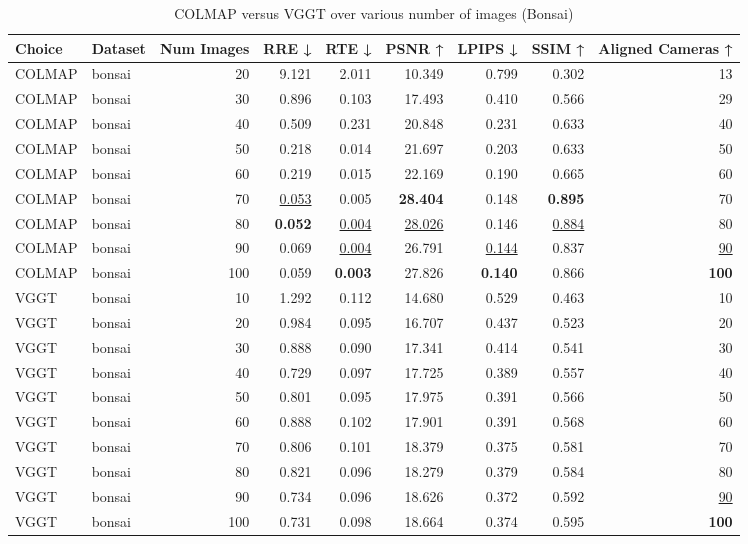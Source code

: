 \begin{table}[H]
\caption{\ifdefined\customcaption \customcaption \else COLMAP versus VGGT over various number of images (Bonsai) \fi}
\label{tab:01_num_images_brief_bonsai}
\centering
\scriptsize
\begin{tabular}{llrrrrrrr}
\toprule
Choice & Dataset & Num Images & RRE ↓ & RTE ↓ & PSNR ↑ & LPIPS ↓ & SSIM ↑ & Aligned Cameras ↑ \\
\midrule
COLMAP & bonsai & 20 & 9.121 & 2.011 & 10.349 & 0.799 & 0.302 & 13 \\
COLMAP & bonsai & 30 & 0.896 & 0.103 & 17.493 & 0.410 & 0.566 & 29 \\
COLMAP & bonsai & 40 & 0.509 & 0.231 & 20.848 & 0.231 & 0.633 & 40 \\
COLMAP & bonsai & 50 & 0.218 & 0.014 & 21.697 & 0.203 & 0.633 & 50 \\
COLMAP & bonsai & 60 & 0.219 & 0.015 & 22.169 & 0.190 & 0.665 & 60 \\
COLMAP & bonsai & 70 & \underline{0.053} & 0.005 & \textbf{28.404} & 0.148 & \textbf{0.895} & 70 \\
COLMAP & bonsai & 80 & \textbf{0.052} & \underline{0.004} & \underline{28.026} & 0.146 & \underline{0.884} & 80 \\
COLMAP & bonsai & 90 & 0.069 & \underline{0.004} & 26.791 & \underline{0.144} & 0.837 & \underline{90} \\
COLMAP & bonsai & 100 & 0.059 & \textbf{0.003} & 27.826 & \textbf{0.140} & 0.866 & \textbf{100} \\
VGGT & bonsai & 10 & 1.292 & 0.112 & 14.680 & 0.529 & 0.463 & 10 \\
VGGT & bonsai & 20 & 0.984 & 0.095 & 16.707 & 0.437 & 0.523 & 20 \\
VGGT & bonsai & 30 & 0.888 & 0.090 & 17.341 & 0.414 & 0.541 & 30 \\
VGGT & bonsai & 40 & 0.729 & 0.097 & 17.725 & 0.389 & 0.557 & 40 \\
VGGT & bonsai & 50 & 0.801 & 0.095 & 17.975 & 0.391 & 0.566 & 50 \\
VGGT & bonsai & 60 & 0.888 & 0.102 & 17.901 & 0.391 & 0.568 & 60 \\
VGGT & bonsai & 70 & 0.806 & 0.101 & 18.379 & 0.375 & 0.581 & 70 \\
VGGT & bonsai & 80 & 0.821 & 0.096 & 18.279 & 0.379 & 0.584 & 80 \\
VGGT & bonsai & 90 & 0.734 & 0.096 & 18.626 & 0.372 & 0.592 & \underline{90} \\
VGGT & bonsai & 100 & 0.731 & 0.098 & 18.664 & 0.374 & 0.595 & \textbf{100} \\
\bottomrule
\end{tabular}
\end{table}